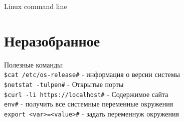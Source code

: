 \documentclass[12pt, a4paper]{article}
\newcommand{\cci}[2]{\indent\texttt{#1\indent \#} - #2 \\}
\begin{document}
	
	\begin{center} {\Huge Linux command line} \end{center}

	
	
	
	
	
	
	
	
	
	
	
	
	

\section{Неразобранное}
\noindent Полезные команды: \\
\cci{\$cat /etc/os-release}{информация о версии системы}
\cci{\$netstat -tulpen}{Открытые порты}
\cci{\$curl -li https://localhost}{Содержимое сайта}
\cci{env}{получить все системные переменные окружения}
\cci{export <var>=<value>}{задать переменнуж окружения}
	
\end{document}
